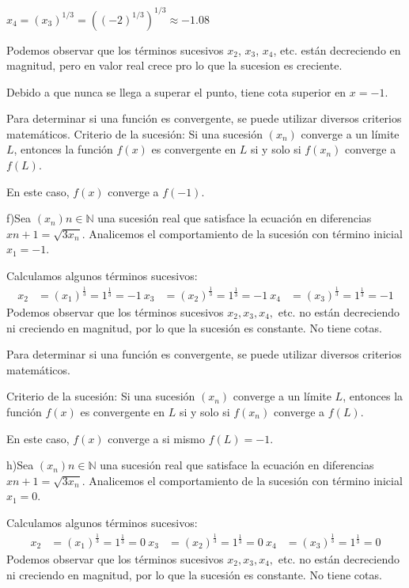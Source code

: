 \documentclass{article}
\begin{document}
$x_4 = (x_3)^{1/3} = ((-2)^{1/3})^{1/3} \approx -1.08$

Podemos observar que los términos sucesivos $x_2$, $x_3$, $x_4$, etc. están decreciendo en magnitud, pero en valor real crece pro lo que la sucesion es creciente.

Debido a que nunca se llega a superar el punto, tiene cota superior en $x = -1$.

Para determinar si una función es convergente, se puede utilizar diversos criterios matemáticos. Criterio de la sucesión: Si una sucesión $(x_n)$ converge a un límite $L$, entonces la función $f(x)$ es convergente en $L$ si y solo si $f(x_n)$ converge a $f(L)$.

En este caso, $f(x)$ converge a $f(-1)$.

f)Sea $(x_n){n \in \mathbb{N}}$ una sucesión real que satisface la ecuación en diferencias $x{n+1} = \sqrt{3x_n}$. Analicemos el comportamiento de la sucesión con término inicial $x_1 = -1$.

Calculamos algunos términos sucesivos:
\begin{align*}
x_2 &= (x_1)^{\frac{1}{3}} = 1^{\frac{1}{3}} = -1 \
x_3 &= (x_2)^{\frac{1}{3}} = 1^{\frac{1}{3}} = -1 \
x_4 &= (x_3)^{\frac{1}{3}} = 1^{\frac{1}{3}} = -1
\end{align*}
Podemos observar que los términos sucesivos $x_2, x_3, x_4,$ etc. no están decreciendo ni creciendo en magnitud, por lo que la sucesión es constante. No tiene cotas.

Para determinar si una función es convergente, se puede utilizar diversos criterios matemáticos.

Criterio de la sucesión: Si una sucesión $(x_n)$ converge a un límite $L$, entonces la función $f(x)$ es convergente en $L$ si y solo si $f(x_n)$ converge a $f(L)$.

En este caso, $f(x)$ converge a si mismo $f(L)= -1$.

h)Sea $(x_n){n \in \mathbb{N}}$ una sucesión real que satisface la ecuación en diferencias $x{n+1} = \sqrt{3x_n}$. Analicemos el comportamiento de la sucesión con término inicial $x_1 = 0$.

Calculamos algunos términos sucesivos:
\begin{align*}
x_2 &= (x_1)^{\frac{1}{3}} = 1^{\frac{1}{3}} = 0 \
x_3 &= (x_2)^{\frac{1}{3}} = 1^{\frac{1}{3}} = 0 \
x_4 &= (x_3)^{\frac{1}{3}} = 1^{\frac{1}{3}} = 0
\end{align*}
Podemos observar que los términos sucesivos $x_2, x_3, x_4,$ etc. no están decreciendo ni creciendo en magnitud, por lo que la sucesión es constante. No tiene cotas.
\end{document}

